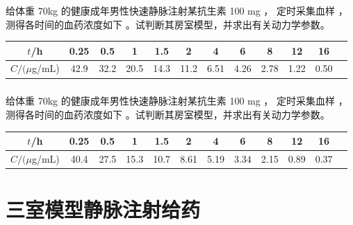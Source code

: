 \documentclass[dvipsnames, svgnames, x11names]{beamer}
\begin{document}
\begin{frame}[t]
    \frametitle{}
    \begin{example}
        给体重 70kg 的健康成年男性快速静脉注射某抗生素 100 mg ， 定时采集血样 ， 测得各时间的血药浓度如下 。试判断其房室模型，并求出有关动力学参数。
        \begin{table}
            \centering
            \begin{tabular}{cccccccccccc}
                \bottomrule
                $t$/h & 0.25 & 0.5 & 1 & 1.5 & 2 & 4 & 6 & 8 & 12 & 16 \\ \hline
                $C/(\mu$g/mL) & 42.9 & 32.2 & 20.5 & 14.3 & 11.2 & 6.51 & 4.26 & 2.78 & 1.22 & 0.50 \\ \toprule
            \end{tabular}
        \end{table}
    \end{example}
\end{frame}


\begin{frame}[t]
    \frametitle{}
    \begin{question}
        给体重 70kg 的健康成年男性快速静脉注射某抗生素 100 mg ， 定时采集血样 ， 测得各时间的血药浓度如下 。试判断其房室模型，并求出有关动力学参数。
        \begin{table}
            \centering
            \begin{tabular}{cccccccccccc}
                \bottomrule
                $t$/h & 0.25 & 0.5 & 1 & 1.5 & 2 & 4 & 6 & 8 & 12 & 16 \\ \hline
                $C/(\mu$g/mL) & 40.4 & 27.5 & 15.3 & 10.7 & 8.61 & 5.19 & 3.34 & 2.15 & 0.89 & 0.37 \\ \toprule
            \end{tabular}
        \end{table}
    \end{question}
\end{frame}


\section{三室模型静脉注射给药}
\end{document}
